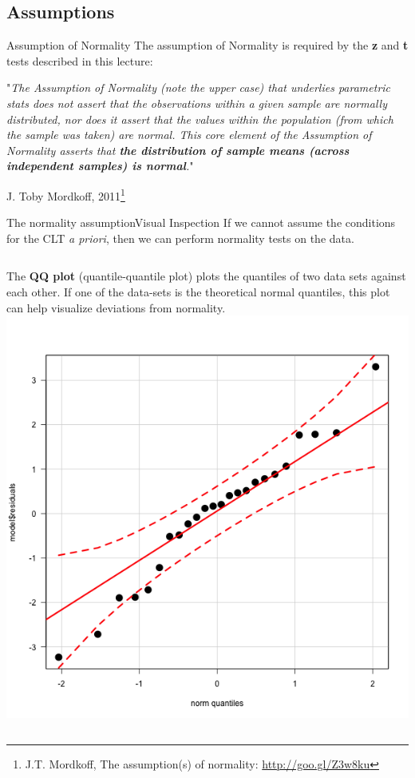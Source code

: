\subsection{Assumptions}
\begin{frame}{Assumption of Normality}
  The assumption of Normality is required by the {\bf z} and {\bf t} tests described in this lecture:\medskip

  \begin{block}{}
    "\emph{The Assumption of Normality (note the upper case) that underlies parametric stats does not assert that the observations within a given sample are normally distributed, nor does it assert that the values within the population (from which the sample was taken) are normal. This core element of the Assumption of Normality asserts that {\bf the distribution of sample means (across independent samples) is normal}.}"\bigskip

    \hfill J. Toby Mordkoff, 2011\footnote{J.T. Mordkoff, The assumption(s) of normality: \url{http://goo.gl/Z3w8ku}}
  \end{block}
\end{frame}

\begin{frame}{The normality assumption}{Visual Inspection}
  If we cannot assume the conditions for the CLT \emph{a priori},
  then we can perform normality tests on the data.

  \begin{columns}
      The {\bf QQ plot} (quantile-quantile plot) plots the quantiles of two data sets against each other. If one of the data-sets is the theoretical normal quantiles, this plot can help visualize deviations from normality.\bigskip
      \includegraphics[width=\textwidth]{../img/qq_plot}
  \end{columns}
\end{frame}

